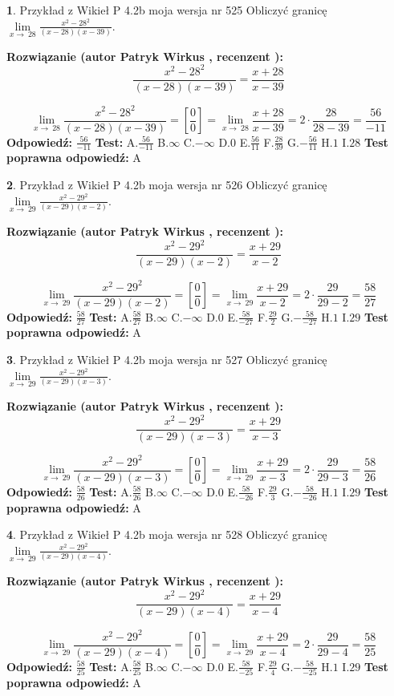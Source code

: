 \documentclass[12pt, a4paper]{article}
\theoremstyle{definition} %
\newtheorem{zad}{}
\newcommand{\zadStart}[1]{\begin{zad}#1\newline}
\newcommand{\zadStop}{\end{zad}}
\newcommand{\rozwStart}[2]{\noindent \textbf{Rozwiązanie (autor #1 , recenzent #2): }\newline}
\newcommand{\rozwStop}{\newline}
\newcommand{\odpStart}{\noindent \textbf{Odpowiedź:}\newline}
\newcommand{\odpStop}{\newline}
\newcommand{\testStart}{\noindent \textbf{Test:}\newline}
\newcommand{\testStop}{\newline}
\newcommand{\kluczStart}{\noindent \textbf{Test poprawna odpowiedź:}\newline}
\newcommand{\kluczStop}{\newline}
\begin{document}
\zadStart{Przykład z Wikieł P 4.2b moja wersja nr 525}
Obliczyć granicę $\lim\limits_{x\to\ 28}\frac{x^{2}-28^{2}}{(x-28)(x-39)}$.
\zadStop
\rozwStart{Patryk Wirkus}{}
$$\frac{x^{2}-28^{2}}{(x-28)(x-39)}=\frac{x+28}{x-39}$$

$$\lim\limits_{x\to\ 28}\frac{x^{2}-28^{2}}{(x-28)(x-39)}=[\frac{0}{0}]=\lim\limits_{x\to\ 28}\frac{x+28}{x-39}=2 \cdot \frac{28}{28-39} = \frac{56}{-11}$$
\rozwStop
\odpStart
$\frac{56}{-11}$
\odpStop
\testStart
A.$\frac{56}{-11}$
B.$\infty$
C.$-\infty$
D.$0$
E.$\frac{56}{11}$
F.$\frac{28}{39}$
G.$-\frac{56}{11}$
H.$1$
I.$28$
\testStop
\kluczStart
A
\kluczStop



\zadStart{Przykład z Wikieł P 4.2b moja wersja nr 526}
Obliczyć granicę $\lim\limits_{x\to\ 29}\frac{x^{2}-29^{2}}{(x-29)(x-2)}$.
\zadStop
\rozwStart{Patryk Wirkus}{}
$$\frac{x^{2}-29^{2}}{(x-29)(x-2)}=\frac{x+29}{x-2}$$

$$\lim\limits_{x\to\ 29}\frac{x^{2}-29^{2}}{(x-29)(x-2)}=[\frac{0}{0}]=\lim\limits_{x\to\ 29}\frac{x+29}{x-2}=2 \cdot \frac{29}{29-2} = \frac{58}{27}$$
\rozwStop
\odpStart
$\frac{58}{27}$
\odpStop
\testStart
A.$\frac{58}{27}$
B.$\infty$
C.$-\infty$
D.$0$
E.$\frac{58}{-27}$
F.$\frac{29}{2}$
G.$-\frac{58}{-27}$
H.$1$
I.$29$
\testStop
\kluczStart
A
\kluczStop



\zadStart{Przykład z Wikieł P 4.2b moja wersja nr 527}
Obliczyć granicę $\lim\limits_{x\to\ 29}\frac{x^{2}-29^{2}}{(x-29)(x-3)}$.
\zadStop
\rozwStart{Patryk Wirkus}{}
$$\frac{x^{2}-29^{2}}{(x-29)(x-3)}=\frac{x+29}{x-3}$$

$$\lim\limits_{x\to\ 29}\frac{x^{2}-29^{2}}{(x-29)(x-3)}=[\frac{0}{0}]=\lim\limits_{x\to\ 29}\frac{x+29}{x-3}=2 \cdot \frac{29}{29-3} = \frac{58}{26}$$
\rozwStop
\odpStart
$\frac{58}{26}$
\odpStop
\testStart
A.$\frac{58}{26}$
B.$\infty$
C.$-\infty$
D.$0$
E.$\frac{58}{-26}$
F.$\frac{29}{3}$
G.$-\frac{58}{-26}$
H.$1$
I.$29$
\testStop
\kluczStart
A
\kluczStop



\zadStart{Przykład z Wikieł P 4.2b moja wersja nr 528}
Obliczyć granicę $\lim\limits_{x\to\ 29}\frac{x^{2}-29^{2}}{(x-29)(x-4)}$.
\zadStop
\rozwStart{Patryk Wirkus}{}
$$\frac{x^{2}-29^{2}}{(x-29)(x-4)}=\frac{x+29}{x-4}$$

$$\lim\limits_{x\to\ 29}\frac{x^{2}-29^{2}}{(x-29)(x-4)}=[\frac{0}{0}]=\lim\limits_{x\to\ 29}\frac{x+29}{x-4}=2 \cdot \frac{29}{29-4} = \frac{58}{25}$$
\rozwStop
\odpStart
$\frac{58}{25}$
\odpStop
\testStart
A.$\frac{58}{25}$
B.$\infty$
C.$-\infty$
D.$0$
E.$\frac{58}{-25}$
F.$\frac{29}{4}$
G.$-\frac{58}{-25}$
H.$1$
I.$29$
\testStop
\kluczStart
A
\kluczStop
\end{document}
